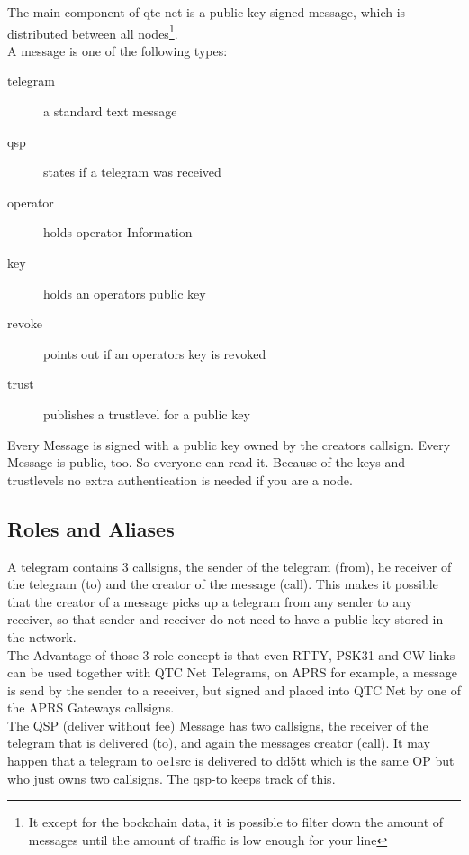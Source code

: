 The main component of qtc net is a public key signed message, which is
distributed between all nodes\footnote{It except for the bockchain data, 
it is possible to filter down the amount of messages until the amount 
of traffic is low enough for your line}.\\

A message is one of the following types: 

\begin{description}
	\item[telegram] a standard text message
	\item[qsp] states if a telegram was received
	\item[operator] holds operator Information
	\item[key] holds an operators public key
	\item[revoke] points out if an operators key is revoked
	\item[trust] publishes a trustlevel for a public key
\end{description}


Every Message is signed with a public key owned by the creators callsign. 
Every Message is public, too. So everyone can read it. Because of the keys 
and trustlevels no extra authentication is needed if you are a node. \\

\subsection{Roles and Aliases}

A telegram contains 3 callsigns, the sender of the telegram (from), he 
receiver of the telegram (to) and the creator of the message (call). This 
makes it possible that the creator of a message picks up a telegram from any 
sender to any receiver, so that sender and receiver do not need to have a 
public key stored in the network.\\

The Advantage of those 3 role concept is that even RTTY, PSK31 and CW links 
can be used together with QTC Net Telegrams, on APRS for example, a message 
is send by the sender to a receiver, but signed and placed into QTC Net by 
one of the APRS Gateways callsigns.\\ 

The QSP (deliver without fee) Message has two callsigns, the receiver of 
the telegram that is delivered (to), and again the messages creator (call). It
may happen that a telegram to oe1src is delivered to dd5tt which is the same OP
but who just owns two callsigns. The qsp-to keeps track of this. \\

